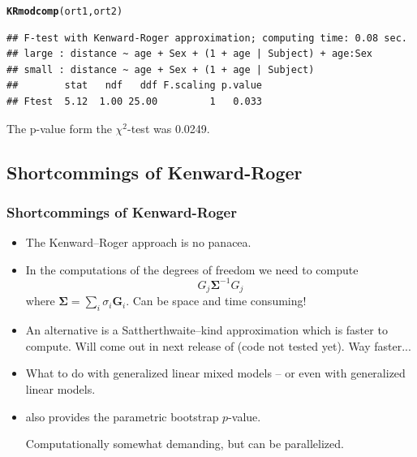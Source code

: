 \documentclass[compress]{beamer}\usepackage[]{graphicx}\usepackage[]{color}
\makeatletter
\newcommand{\hlstd}[1]{\textcolor[rgb]{0.345,0.345,0.345}{#1}}%
\newcommand{\hlkwd}[1]{\textcolor[rgb]{0.737,0.353,0.396}{\textbf{#1}}}%
\newenvironment{kframe}{%
 \def\at@end@of@kframe{}%
 \ifinner\ifhmode%
  \def\at@end@of@kframe{\end{minipage}}%
  \begin{minipage}{\columnwidth}%
 \fi\fi%
 \def\FrameCommand##1{\hskip\@totalleftmargin \hskip-\fboxsep
 \colorbox{shadecolor}{##1}\hskip-\fboxsep
     \hskip-\linewidth \hskip-\@totalleftmargin \hskip\columnwidth}%
 \MakeFramed {\advance\hsize-\width
   \@totalleftmargin\z@ \linewidth\hsize
   \@setminipage}}%
 {\par\unskip\endMakeFramed%
 \at@end@of@kframe}
\newenvironment{knitrout}{}{} %
\def\Sigmab{\bm{\Sigma}}
\newenvironment{sframe}
{\begin{frame} [containsverbatim] }
  {\end{frame}}
\makeatother
\begin{document}
\begin{sframe}
\begin{knitrout}\scriptsize
{}\color{fgcolor}\begin{kframe}
\begin{alltt}
\hlkwd{KRmodcomp}\hlstd{(ort1, ort2)}
\end{alltt}
\begin{verbatim}
## F-test with Kenward-Roger approximation; computing time: 0.08 sec.
## large : distance ~ age + Sex + (1 + age | Subject) + age:Sex
## small : distance ~ age + Sex + (1 + age | Subject)
##        stat   ndf   ddf F.scaling p.value
## Ftest  5.12  1.00 25.00         1   0.033
\end{verbatim}
\end{kframe}
\end{knitrout}
The p-value form the  $\chi^2$-test was 0.0249.

\end{sframe}


\subsection{Shortcommings of Kenward-Roger}
\begin{sframe}
\frametitle{Shortcommings of Kenward-Roger}

\begin{itemize}
\item The Kenward--Roger approach is no panacea.
\item In the computations of the degrees of freedom we need to compute
  \begin{displaymath}
    G_j {\bm \Sigma}^{-1} G_j
  \end{displaymath}
  where $\Sigmab= \sum_i \sigma_i \bm G_i$. 
  Can be space and time consuming!
\item An alternative is a Sattherthwaite--kind approximation which is faster to
  compute. Will come out in next release of  (code not tested yet). 
  Way faster...

\item What to do with generalized linear mixed models -- or even
  with generalized linear models.
  
\item 
   also provides the parametric bootstrap $p$-value. 
  
  Computationally somewhat demanding, but can be parallelized. 
\end{itemize}

  
\end{sframe}
\end{document}
